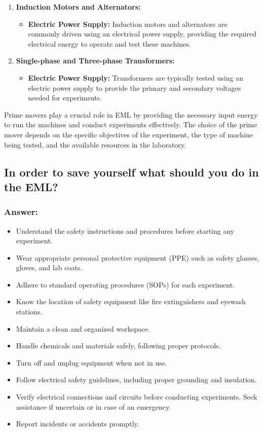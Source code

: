\documentclass[12pt]{article}
\begin{document}
\begin{enumerate}
    \item \textbf{Induction Motors and Alternators:}
        \begin{itemize}
            \item \textbf{Electric Power Supply: } Induction motors and alternators are commonly driven using an electrical power supply, providing the required electrical energy to operate and test these machines.
        \end{itemize}
    \item \textbf{Single-phase and Three-phase Transformers:}
        \begin{itemize}
            \item \textbf{Electric Power Supply: } Transformers are typically tested using an electric power supply to provide the primary and secondary voltages needed for experiments.
        \end{itemize}
\end{enumerate}
Prime movers play a crucial role in EML by providing the necessary input energy to run the machines and conduct experiments effectively. The choice of the prime mover depends on the specific objectives of the experiment, the type of machine being tested, and the available resources in the laboratory.


\vspace{0.5cm}
\subsection{In order to save yourself what should you do in the EML?}
\subsubsection*{Answer:}
\begin{itemize}
    \item Understand the safety instructions and procedures before starting any experiment.
    \item Wear appropriate personal protective equipment (PPE) such as safety glasses, gloves, and lab coats.
    \item Adhere to standard operating procedures (SOPs) for each experiment.
    \item Know the location of safety equipment like fire extinguishers and eyewash stations.
    \item Maintain a clean and organized workspace.
    \item Handle chemicals and materials safely, following proper protocols.
    \item Turn off and unplug equipment when not in use.
    \item Follow electrical safety guidelines, including proper grounding and insulation.
    \item Verify electrical connections and circuits before conducting experiments. Seek assistance if uncertain or in case of an emergency.
    \item Report incidents or accidents promptly.
\end{itemize}
\end{document}
